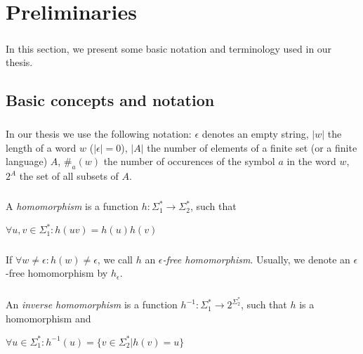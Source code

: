 \chapter{Preliminaries}
\label{chap:Preliminaries}

\paragraph{}
In this section, we present some basic notation and terminology used in our thesis.

\section{Basic concepts and notation}

\paragraph{}
\oznacenie In our thesis we use the following notation: $\epsilon $ denotes an empty string, $|w|$ the length of a word $w$ ($|\epsilon |=0$), $|A|$ the number of elements of a finite set (or a finite language) $A$, $\# _{a}(w)$ the number of occurences of the symbol $a$ in the word $w$, $2^{A}$ the set of all subsets of $A$.

\paragraph{}
 A \emph{homomorphism} is a function $h: \Sigma_{1}^{*} \rightarrow \Sigma_{2}^{*}$, such that \\	
\centerline{$\forall u, v \in \Sigma_1^*: h(uv) = h(u)h(v)$}

\paragraph{}
\oznacenie If $\forall w \neq \epsilon : h(w) \neq \epsilon $, we call $h$ an \emph{$\epsilon $-free homomorphism}. Usually, we denote an $\epsilon $-free homomorphism by $h_{\epsilon }$.

\paragraph{}
 An \emph{inverse homomorphism} is a function $h^{-1}: \Sigma_{1}^{*} \rightarrow 2^{\Sigma_{2}^{*}}$, such that $h$ is a homomorphism and \\
\centerline{$\forall u \in \Sigma_1^*: h^{-1}(u) = \{ v \in \Sigma_2^* | h(v) = u \} $}

